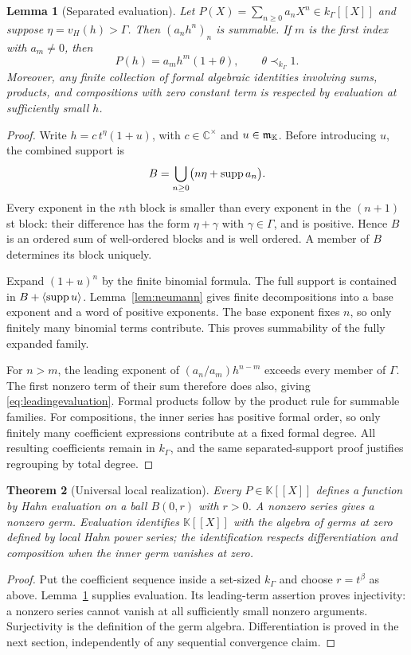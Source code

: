 \documentclass[11pt,a4paper]{article}
\newtheorem{theorem}{Theorem}[section]
\newtheorem{lemma}[theorem]{Lemma}
\theoremstyle{definition}\newtheorem{definition}[theorem]{Definition}
\theoremstyle{remark}\newtheorem{remark}[theorem]{Remark}
\newcommand{\K}{\mathbb K}
\newcommand{\C}{\mathbb C}\newcommand{\R}{\mathbb R}\newcommand{\N}{\mathbb N}\newcommand{\Z}{\mathbb Z}
\newcommand{\vH}{v_H}
\newcommand{\smallfield}{k_\Gamma}
\numberwithin{equation}{section}
\begin{document}
\begin{lemma}[Separated evaluation]\label{lem:separated}
Let $P(X)=\sum_{n\geq0}a_nX^n\in\smallfield[[X]]$ and suppose $\eta=\vH(h)>\Gamma$. Then $(a_nh^n)_n$ is summable. If $m$ is the first index with $a_m\ne0$, then
\begin{equation}\label{eq:leadingevaluation}
 P(h)=a_mh^m(1+\theta),\qquad\theta\prec_{\smallfield}1.
\end{equation}
Moreover, any finite collection of formal algebraic identities involving sums, products, and compositions with zero constant term is respected by evaluation at sufficiently small $h$.
\end{lemma}
\begin{proof}
Write $h=c\,t^\eta(1+u)$, with $c\in\C^\times$ and $u\in\infinit$. Before introducing $u$, the combined support is
\[
 B=\bigcup_{n\geq0}\bigl(n\eta+\operatorname{supp} a_n\bigr).
\]
Every exponent in the $n$th block is smaller than every exponent in the $(n+1)$st block: their difference has the form $\eta+\gamma$ with $\gamma\in\Gamma$, and is positive. Hence $B$ is an ordered sum of well-ordered blocks and is well ordered. A member of $B$ determines its block uniquely.

Expand $(1+u)^n$ by the finite binomial formula. The full support is contained in $B+\langle\operatorname{supp} u\rangle$. Lemma~\ref{lem:neumann} gives finite decompositions into a base exponent and a word of positive exponents. The base exponent fixes $n$, so only finitely many binomial terms contribute. This proves summability of the fully expanded family.

For $n>m$, the leading exponent of $(a_n/a_m)h^{n-m}$ exceeds every member of $\Gamma$. The first nonzero term of their sum therefore does also, giving \eqref{eq:leadingevaluation}. Formal products follow by the product rule for summable families. For compositions, the inner series has positive formal order, so only finitely many coefficient expressions contribute at a fixed formal degree. All resulting coefficients remain in $\smallfield$, and the same separated-support proof justifies regrouping by total degree.
\end{proof}

\begin{theorem}[Universal local realization]\label{thm:realization}
Every $P\in\K[[X]]$ defines a function by Hahn evaluation on a ball $B(0,r)$ with $r>0$. A nonzero series gives a nonzero germ. Evaluation identifies $\K[[X]]$ with the algebra of germs at zero defined by local Hahn power series; the identification respects differentiation and composition when the inner germ vanishes at zero.
\end{theorem}
\begin{proof}
Put the coefficient sequence inside a set-sized $\smallfield$ and choose $r=t^\beta$ as above. Lemma~\ref{lem:separated} supplies evaluation. Its leading-term assertion proves injectivity: a nonzero series cannot vanish at all sufficiently small nonzero arguments. Surjectivity is the definition of the germ algebra. Differentiation is proved in the next section, independently of any sequential convergence claim.
\end{proof}
\end{document}
